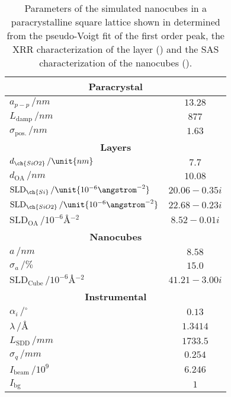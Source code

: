 \documentclass[\main/dresen_thesis.tex]{subfiles}
\begin{document}
  \begin{table}[!htbp]
    \centering
    \caption{\label{tab:monolayers:structure:squareArrayParacrystal:BornAgainSimulation}Parameters of the simulated nanocubes in a paracrystalline square lattice shown in  determined from the pseudo-Voigt fit of the first order peak, the XRR characterization of the layer () and the SAS characterization of the nanocubes ().}
    \begin{tabular}{l | c}
      \hline
      \multicolumn{2}{c}{\textbf{Paracrystal}}\\
      \hline
      $a_{p-p} \, / \unit{nm}$                                        & $13.28$ \\
      $L_\mathrm{damp} \, / \unit{nm}$                                & $877$ \\
      $\sigma_\mathrm{pos.}\, / \unit{nm}$                            & $1.63$ \\
      \hline
      \multicolumn{2}{c}{\textbf{Layers}}\\
      \hline
      $d_{\ch{SiO2}}\, / \unit{nm}$                                   & $7.7$\\
      $d_{\mathrm{OA}}\, / \unit{nm}$                                 & $10.08$\\
      $\mathrm{SLD}_{\ch{Si}} \, / \unit{10^{-6} \angstrom^{-2}}$     & $20.06 - 0.35 i$\\
      $\mathrm{SLD}_{\ch{SiO2}} \, / \unit{10^{-6} \angstrom^{-2}}$   & $22.68 - 0.23 i$\\
      $\mathrm{SLD}_\mathrm{OA} \, / \unit{10^{-6} \angstrom^{-2}}$   & $8.52 - 0.01 i$ \\
      \hline
      \multicolumn{2}{c}{\textbf{Nanocubes}}\\
      \hline
      $a \, / \unit{nm}$                                              & $8.58$ \\
      $\sigma_a \, / \unit{\%}$                                       & $15.0$ \\
      $\mathrm{SLD}_\mathrm{Cube} \, / \unit{10^{-6} \angstrom^{-2}}$ & $41.21 - 3.00 i$ \\
      \hline
      \multicolumn{2}{c}{\textbf{Instrumental}}\\
      \hline
      $\alpha_i \, / \unit{^\circ}$                                   & $0.13$ \\
      $\lambda \, / \unit{\angstrom}$                                 & $1.3414$ \\
      $L_\mathrm{SDD} \, / \unit{mm}$                                 & $1733.5$ \\
      $\sigma_q \, /\unit{mm}$                                        & $0.254$ \\
      $I_\mathrm{beam} \, / \unit{10^9}$                              & $6.246$ \\
      $I_\mathrm{bg}$                                                 & $1$ \\
      \hline
    \end{tabular}
  \end{table}
\end{document}
